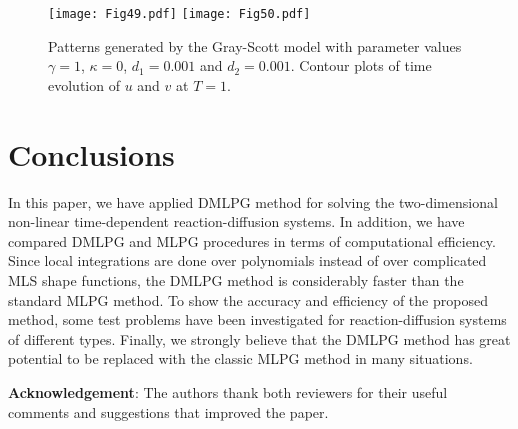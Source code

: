 \documentclass[12pt]{article}
\numberwithin{equation}{section}
\begin{document}
\begin{figure}
\begin{center}
\texttt{[image: Fig49.pdf]}
\texttt{[image: Fig50.pdf]}
\caption{Patterns generated by the Gray-Scott model with parameter values $\gamma = 1$, $\kappa = 0$, $d_1=0.001$ and $d_2=0.001$. Contour plots of time
evolution of $u$ and $v$ at $T=1$. }
\end{center}
\end{figure}

\section{Conclusions}
In this paper, we have applied DMLPG method for solving the two-dimensional non-linear time-dependent reaction-diffusion systems. In addition, we have compared DMLPG and MLPG procedures in terms of computational efficiency. Since local integrations are done over polynomials instead of over complicated MLS shape functions, the DMLPG method is considerably faster than the standard MLPG method. To show the accuracy and efficiency of the proposed method, some test problems have been investigated for reaction-diffusion systems of different types. Finally, we strongly believe that the DMLPG method has great potential to be replaced with the classic MLPG method in many situations.

{\bf Acknowledgement}:
The authors thank both reviewers for their useful comments and
suggestions that improved the paper.
\end{document}
